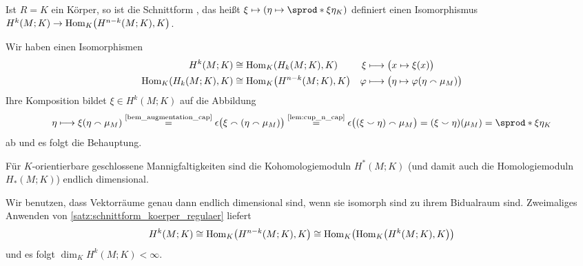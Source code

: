 \begin{satz}[{name=[Für einen Körper sind Schnittformen regulär]},label=satz:schnittform_koerper_regulaer]
	Ist $R=K$ ein Körper, so ist die Schnittform , das heißt $\xi \mapsto \enbrace*{\eta \mapsto \sprod*{\xi}{\eta}_K}$ definiert einen Isomorphismus $H^k(M;K) \to \Hom_K \enbrace*{H^{n-k}(M;K),K}$.
\end{satz}
\begin{beweis}
	Wir haben einen Isomorphismen
	\begin{align}
		H^k(M;K) &\cong \Hom_K \enbrace*{H_k(M;K),K}  & \xi &\longmapsto  \enbrace[\big]{x \mapsto \xi(x)} \\
		\Hom_K \enbrace*{H_k(M;K),K} &\cong \Hom_K \enbrace*{H^{n-k}(M;K),K}   &  \varphi &\longmapsto  \enbrace[\big]{\eta \mapsto \varphi \enbrace*{\eta \capp \mu_M}}
	\end{align}
	Ihre Komposition bildet $\xi \in H^k(M;K)$ auf die Abbildung
	\[
		\eta \longmapsto \xi \enbrace*{\eta \capp \mu_M} \StackText{\ref{bem_augmentation_cap}}{=} \epsilon \enbrace[\big]{\xi \capp (\eta \capp \mu_M)} \StackText{\ref{lem:cup_n_cap}}{=} \epsilon \enbrace[\big]{(\xi \cupp \eta) \capp \mu_M} = (\xi \cupp \eta)(\mu_M) = \sprod*{\xi}{\eta}_K
	\]
	ab und es folgt die Behauptung.
\end{beweis}

\begin{korollar}[{name=[Kohomologiemoduln über $K$ sind endlichdimensional]}]
	Für $K$-orientierbare geschlossene Mannigfaltigkeiten sind die Kohomologiemoduln $H^*(M;K)$ (und damit auch die Homologiemoduln $H_*(M;K)$) endlich dimensional.
\end{korollar}
\begin{beweis}
	Wir benutzen, dass Vektorräume genau dann endlich dimensional sind, wenn sie isomorph sind zu ihrem Bidualraum sind.
	Zweimaliges Anwenden von \autoref{satz:schnittform_koerper_regulaer} liefert
	\[
		H^k(M;K) \cong \Hom_K \enbrace*{H^{n-k}(M;K),K} \cong \Hom_K \enbrace*{\Hom_K \enbrace*{H^k(M;K),K}} 
	\]
	und es folgt $\dim_K H^k(M;K) < \infty$.
\end{beweis}

